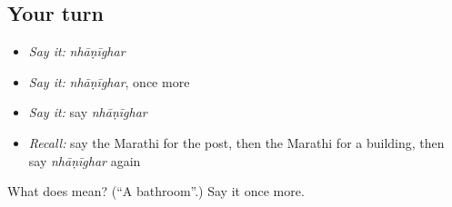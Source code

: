 \subsection*{Your turn}
\begin{itemize}
\raggedright
  \item \emph{Say it:} \emph{nhāṇīghar}
  \item \emph{Say it:} \emph{nhāṇīghar}, once more
  \item \emph{Say it:} say \emph{nhāṇīghar}
  \item \emph{Recall:} say the Marathi for the post, then the Marathi for a building, then say \emph{nhāṇīghar} again
\end{itemize}

\begin{tcolorbox}[breakable,colback=teal!4,colframe=teal!35!black,title={Before you move on}]
What does  mean? (\textquotedblleft{}A bathroom\textquotedblright{}.) Say it once more.
\end{tcolorbox}
